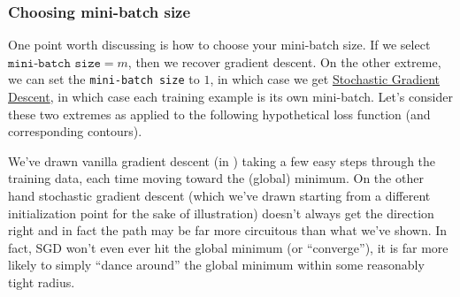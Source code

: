 \documentclass[12pt]{article}
\begin{document}
\subsubsection{Choosing mini-batch size}
One point worth discussing is how to choose your mini-batch size. If we select $\texttt{mini-batch size} = m$, then we recover gradient descent. On the other extreme, we can set the \texttt{mini-batch size} to $1$, in which case we get 
\href{https://en.wikipedia.org/wiki/Stochastic_gradient_descent}{Stochastic Gradient Descent}, in which case each 
training example is its own mini-batch. Let's consider these two extremes as applied to the following hypothetical loss function (and corresponding contours).
{
\begin{figure}[h]
\centering
{} 
\end{figure}
}

We've drawn vanilla gradient descent (in \color{orange}{orange}\color{black}) taking a few easy steps through the training data, each time moving toward the 
(global) minimum. On the other hand stochastic gradient descent (which we've drawn starting from a different initialization point for the sake of illustration) 
doesn't always get the direction right and in fact the path may be
far more circuitous than what we've shown. In fact, SGD won't even ever hit the global minimum (or ``converge''), it is far more likely to simply ``dance around'' the global minimum within some reasonably tight radius.
\end{document}
